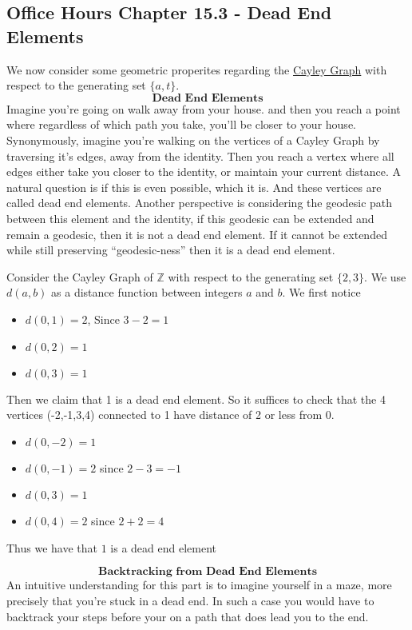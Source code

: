 \subsection{Office Hours Chapter 15.3 - Dead End Elements}
We now consider some geometric properites regarding the \href{https://en.wikipedia.org/wiki/Cayley_graph}{Cayley Graph} with respect to the generating set $\{a,t\}$.
\[\textbf{Dead End Elements}\]
Imagine you're going on walk away from your house. and then you reach a point where regardless of which path you take, you'll be closer to your house. Synonymously, imagine you're walking on the vertices of a Cayley Graph by traversing it's edges, away from the identity. Then you reach a vertex where all edges either take you closer to the identity, or maintain your current distance. A natural question is if this is even possible, which it is. And these vertices are called dead end elements. Another perspective is considering the geodesic path between this element and the identity, if this geodesic can be extended and remain a geodesic, then it is not a dead end element. If it cannot be extended while still preserving ``geodesic-ness'' then it is a dead end element.
\newpage
\begin{example}
    Consider the Cayley Graph of $\mathbb{Z}$ with respect to the generating set $\{2,3\}$. We use $d(a,b)$ as a distance function between integers $a$ and $b$. We first notice
    \begin{itemize}
        \item $d(0,1)= 2$, Since $3-2=1$
        \item $d(0,2) = 1$
        \item $d(0,3) = 1$ 
    \end{itemize}
    Then we claim that 1 is a dead end element. So it suffices to check that the 4 vertices (-2,-1,3,4) connected to 1 have distance of 2 or less from $0$.
    \begin{itemize}
        \item $d(0,-2)=1$
        \item $d(0,-1) = 2$ since $2-3=-1$
        \item $d(0,3) = 1$
        \item $d(0,4) = 2$ since $2+2=4$
    \end{itemize}
    Thus we have that $1$ is a dead end element
\end{example}
\[\textbf{Backtracking from Dead End Elements}\]
An intuitive understanding for this part is to imagine yourself in a maze, more precisely that you're stuck in a dead end. In such a case you would have to backtrack your steps before your on a path that does lead you to the end.

